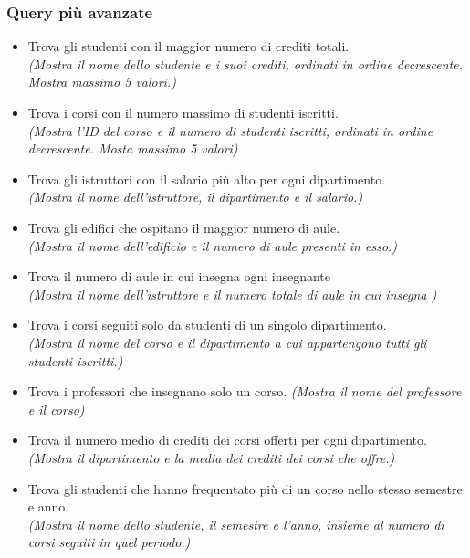 \subsubsection*{Query più avanzate}
\begin{itemize}
	\item Trova gli studenti con il maggior numero di crediti totali. \\
	      \textit{(Mostra il nome dello studente e i suoi crediti, ordinati in ordine decrescente. Mostra massimo 5 valori.)}

	\item Trova i corsi con il numero massimo di studenti iscritti. \\
	      \textit{(Mostra l'ID del corso e il numero di studenti iscritti, ordinati in ordine decrescente. Mosta massimo 5 valori)}

	\item Trova gli istruttori con il salario più alto per ogni dipartimento. \\
	      \textit{(Mostra il nome dell'istruttore, il dipartimento e il salario.)}

	\item Trova gli edifici che ospitano il maggior numero di aule. \\
	      \textit{(Mostra il nome dell’edificio e il numero di aule presenti in esso.)}

	\item Trova il numero di aule in cui insegna ogni insegnante \\
	      \textit{(Mostra il nome dell'istruttore e il numero totale di aule in cui insegna )}

	\item Trova i corsi seguiti solo da studenti di un singolo dipartimento. \\
	      \textit{(Mostra il nome del corso e il dipartimento a cui appartengono tutti gli studenti iscritti.)}

	\item Trova i professori che insegnano solo un corso.
	      \textit{(Mostra il nome del professore e il corso)}

	\item Trova il numero medio di crediti dei corsi offerti per ogni dipartimento. \\
	      \textit{(Mostra il dipartimento e la media dei crediti dei corsi che offre.)}

	\item Trova gli studenti che hanno frequentato più di un corso nello stesso semestre e anno. \\
	      \textit{(Mostra il nome dello studente, il semestre e l'anno, insieme al numero di corsi seguiti in quel periodo.)}


\end{itemize}
